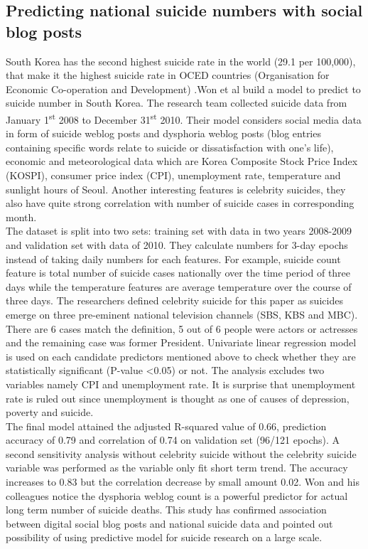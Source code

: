 \subsection{Predicting national suicide numbers with social blog posts}
South Korea has the second highest suicide rate in the world (29.1 per 100,000), that make it the highest suicide rate in OCED countries (Organisation for Economic Co-operation and Development) \cite{Yoon2015}.Won et al \cite{Won2013} build a model to predict to suicide number in South Korea. The research team collected suicide data from January 1\textsuperscript{st} 2008 to December 31\textsuperscript{st} 2010. Their model considers social media data in form of suicide weblog posts and dysphoria weblog posts (blog entries containing specific words relate to suicide or dissatisfaction with one’s life), economic and meteorological data which are Korea Composite Stock Price Index (KOSPI), consumer price index (CPI), unemployment rate, temperature and sunlight hours of Seoul. Another interesting features is celebrity suicides, they also have quite strong correlation with number of suicide cases in corresponding month.\\
The dataset is split into two sets: training set with data in two years 2008-2009 and validation set with data of 2010. They calculate numbers for 3-day epochs instead of taking daily numbers for each features. For example, suicide count feature is total number of suicide cases nationally over the time period of three days while the temperature features are average temperature over the course of three days. The researchers defined celebrity suicide for this paper as suicides emerge on three pre-eminent national television channels (SBS, KBS and MBC). There are 6 cases match the definition, 5 out of 6 people were actors or actresses and the remaining case was former President. Univariate linear regression model is used on each candidate predictors mentioned above to check whether they are statistically significant (P-value \textless  0.05) or not. The analysis excludes two variables namely CPI and unemployment rate. It is surprise that unemployment rate is ruled out since unemployment is thought as one of causes of depression, poverty and suicide.\\
The final model attained the adjusted R-squared value of 0.66, prediction accuracy of 0.79 and correlation of 0.74 on validation set (96/121 epochs). A second sensitivity analysis without celebrity suicide without the celebrity suicide variable was performed as the variable only fit short term trend. The accuracy increases to 0.83 but the correlation decrease by small amount 0.02. Won and his colleagues notice the dysphoria weblog count is a powerful predictor for actual long term number of suicide deaths. This study has confirmed association between digital social blog posts and national suicide data and pointed out possibility of using predictive model for suicide research on a large scale. \\

